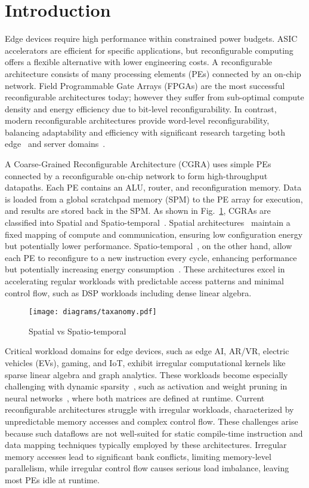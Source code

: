 \section{Introduction}
Edge devices require high performance within constrained power budgets. ASIC accelerators are efficient for specific applications, but reconfigurable computing offers a flexible alternative with lower engineering costs. A reconfigurable architecture consists of many processing elements (PEs) connected by an on-chip network. 
Field Programmable Gate Arrays (FPGAs) are the most successful reconfigurable architectures today; however they suffer from sub-optimal compute density and energy efficiency due to bit-level reconfigurability.
In contrast, modern reconfigurable architectures provide word-level reconfigurability, balancing adaptability and efficiency with significant research targeting both edge~\cite{adres, hycube, snafu, riptide} and server domains~\cite{fifer, plasticine, capstan, amber}.

A Coarse-Grained Reconfigurable Architecture (CGRA) uses simple PEs connected by a reconfigurable on-chip network to form high-throughput datapaths. Each PE contains an ALU, router, and reconfiguration memory. Data is loaded from a global scratchpad memory (SPM) to the PE array for execution, and results are stored back in the SPM. As shown in Fig.~\ref{fig:taxanomy}, CGRAs are classified into Spatial and Spatio-temporal~\cite{revel}. 
Spatial architectures~\cite{snafu, softbrain, piperench, riptide} maintain a fixed mapping of compute and communication, ensuring low configuration energy but potentially lower performance. 
Spatio-temporal~\cite{adres, hycube, trips, wavescalar}, on the other hand, allow each PE to reconfigure to a new instruction every cycle, enhancing performance but potentially increasing energy consumption~\cite{flex}. These architectures excel in accelerating regular workloads with predictable access patterns and minimal control flow, such as DSP workloads including dense linear algebra.
\begin{figure}[t!]
	\scriptsize
	\centering
	\texttt{[image: diagrams/taxanomy.pdf]}
	\caption{Spatial vs Spatio-temporal}
	\label{fig:taxanomy}
\end{figure}

Critical workload domains for edge devices, such as edge AI, AR/VR, electric vehicles (EVs), gaming, and IoT, exhibit irregular computational kernels like sparse linear algebra and graph analytics.
These workloads become especially challenging with dynamic sparsity~\cite{pit}, such as activation and weight pruning in neural networks~\cite{teal_activationsparsity}, where both matrices are defined at runtime.
Current reconfigurable architectures struggle with irregular workloads, characterized by unpredictable memory accesses and complex control flow. These challenges arise because such dataflows are not well-suited for static compile-time instruction and data mapping techniques typically employed by these architectures. Irregular memory accesses lead to significant bank conflicts, limiting memory-level parallelism, while irregular control flow causes serious load imbalance, leaving most PEs idle at runtime. 

